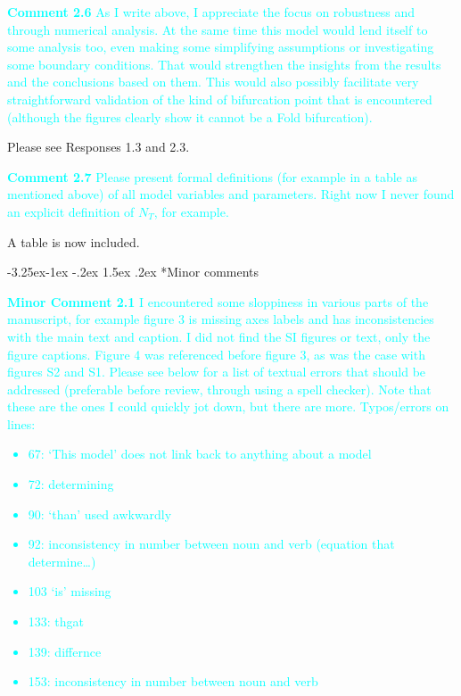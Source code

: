 \documentclass[ucm,12pt]{ucletter}
\makeatletter
\newcounter{section}
\newcounter{subsection}[section]
\newcommand\subsection{\@startsection{subsection}{2}{\z@}%
                                     {-3.25ex\@plus -1ex \@minus -.2ex}%
                                     {1.5ex \@plus .2ex}%
                                     {\normalfont\large\bfseries}}
\makeatother
\begin{document}
\begin{letter}
\noindent \textcolor{cyan}{
{\bf Comment 2.6} As I write above, I appreciate the focus on robustness and through numerical analysis. At the same time this model would lend itself to some analysis too, even making some simplifying assumptions or investigating some boundary conditions. That would strengthen the insights from the results and the conclusions based on them. This would also possibly facilitate very straightforward validation of the kind of bifurcation point that is encountered (although the figures clearly show it cannot be a Fold bifurcation).
}

 Please see Responses 1.3 and 2.3.

\noindent \textcolor{cyan}{
{\bf Comment 2.7} Please present formal definitions (for example in a table as mentioned above) of all model variables and parameters. Right now I never found an explicit definition of $N_T$, for example.
}

 A table is now included.


\subsection*{Minor comments}
\noindent \textcolor{cyan}{
{\bf Minor Comment 2.1} I encountered some sloppiness in various parts of the manuscript, for example figure 3 is missing axes labels and has inconsistencies with the main text and caption. I did not find the SI figures or text, only the figure captions. Figure 4 was referenced before figure 3, as was the case with figures S2 and S1. Please see below for a list of textual errors that should be addressed (preferable before review, through using a spell checker). Note that these are the ones I could quickly jot down, but there are more.
Typos/errors on lines:
\begin{itemize}
\item 67:   ‘This model’ does not link back to anything about a model
\item 72:   determining
\item 90:   ‘than’ used awkwardly
\item 92:   inconsistency in number between noun and verb (equation that determine…)
\item 103  ‘is’ missing
\item 133: thgat
\item 139: differnce
\item 153:  inconsistency in number between noun and verb
\end{itemize}
}


\end{letter}
\end{document}
